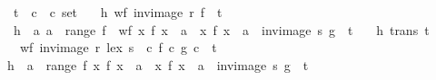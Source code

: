 \begin{isabellebody}
\ \ t\ {\isacharcolon}{\kern0pt}{\isacharcolon}{\kern0pt}\ {\isachardoublequoteopen}{\isacharparenleft}{\kern0pt}{\isacharprime}{\kern0pt}c\ {\isasymtimes}\ {\isacharprime}{\kern0pt}c{\isacharparenright}{\kern0pt}\ set{\isachardoublequoteclose}\isanewline
\ \ \ h{}{\isacharcolon}{\kern0pt}\ {\isachardoublequoteopen}wf\ {\isacharparenleft}{\kern0pt}{\isacharparenleft}{\kern0pt}inv{\isacharunderscore}{\kern0pt}image\ r\ f{\isacharparenright}{\kern0pt}\ {\isasyminter}\ t{\isacharparenright}{\kern0pt}{\isachardoublequoteclose}\ \isanewline
\ \ h{}{\isacharcolon}{\kern0pt}\ {\isachardoublequoteopen}{\isasymAnd}\ a{\isachardot}{\kern0pt}\ a\ {\isasymin}\ range\ f\ {\isasymLongrightarrow}\ wf\ {\isacharparenleft}{\kern0pt}{\isacharparenleft}{\kern0pt}{\isacharbraceleft}{\kern0pt}x{\isachardot}{\kern0pt}\ f\ x\ {\isacharequal}{\kern0pt}\ a{\isacharbraceright}{\kern0pt}\ {\isasymtimes}\ {\isacharbraceleft}{\kern0pt}x{\isachardot}{\kern0pt}\ f\ x\ {\isacharequal}{\kern0pt}\ a{\isacharbraceright}{\kern0pt}\ {\isasyminter}\ {\isacharparenleft}{\kern0pt}inv{\isacharunderscore}{\kern0pt}image\ s\ g{\isacharparenright}{\kern0pt}{\isacharparenright}{\kern0pt}\ {\isasyminter}\ t{\isacharparenright}{\kern0pt}{\isachardoublequoteclose}\ \isanewline
\ \ h{}{\isacharcolon}{\kern0pt}\ {\isachardoublequoteopen}trans\ t{\isachardoublequoteclose}\isanewline
\ \ \ {\isachardoublequoteopen}wf\ {\isacharparenleft}{\kern0pt}{\isacharparenleft}{\kern0pt}inv{\isacharunderscore}{\kern0pt}image\ {\isacharparenleft}{\kern0pt}r\ {\isacharless}{\kern0pt}{\isacharasterisk}{\kern0pt}lex{\isacharasterisk}{\kern0pt}{\isachargreater}{\kern0pt}\ s{\isacharparenright}{\kern0pt}\ {\isacharparenleft}{\kern0pt}{\isasymlambda}\ c{\isachardot}{\kern0pt}\ {\isacharparenleft}{\kern0pt}f\ c{\isacharcomma}{\kern0pt}\ g\ c{\isacharparenright}{\kern0pt}{\isacharparenright}{\kern0pt}{\isacharparenright}{\kern0pt}\ {\isasyminter}\ t{\isacharparenright}{\kern0pt}{\isachardoublequoteclose}\isanewline
%
\isadelimproof
%
\endisadelimproof
%
\isatagproof
{}\isamarkupfalse%
{\isacharminus}{\kern0pt}\isanewline
\ \ \isamarkupfalse%
\ h{}{\isacharcolon}{\kern0pt}\ {\isachardoublequoteopen}{\isacharparenleft}{\kern0pt}{\isasymUnion}\ a\ {\isasymin}\ range\ f{\isachardot}{\kern0pt}\ {\isacharparenleft}{\kern0pt}{\isacharbraceleft}{\kern0pt}x{\isachardot}{\kern0pt}\ f\ x\ {\isacharequal}{\kern0pt}\ a{\isacharbraceright}{\kern0pt}\ {\isasymtimes}\ {\isacharbraceleft}{\kern0pt}x{\isachardot}{\kern0pt}\ f\ x\ {\isacharequal}{\kern0pt}\ a{\isacharbraceright}{\kern0pt}\ {\isasyminter}\ {\isacharparenleft}{\kern0pt}inv{\isacharunderscore}{\kern0pt}image\ s\ g{\isacharparenright}{\kern0pt}{\isacharparenright}{\kern0pt}\ {\isasyminter}\ t{\isacharparenright}{\kern0pt}\ {\isacharequal}{\kern0pt}\ \isanewline

\end{isabellebody}
